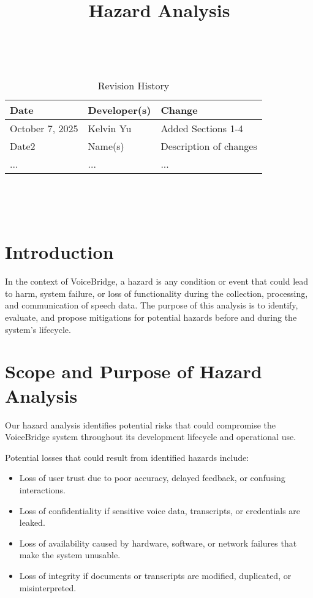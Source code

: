 \documentclass{article}
\title{Hazard Analysis\\\progname}
\author{\authname}
\date{}
\begin{document}
\maketitle
\thispagestyle{empty}

~\newpage


\begin{table}[hp]
\caption{Revision History} \label{TblRevisionHistory}
\begin{tabularx}{\textwidth}{llX}
\toprule
\textbf{Date} & \textbf{Developer(s)} & \textbf{Change}\\
\midrule
October 7, 2025 & Kelvin Yu & Added Sections 1-4\\
Date2 & Name(s) & Description of changes\\
... & ... & ...\\
\bottomrule
\end{tabularx}
\end{table}

~\newpage

\tableofcontents

~\newpage



\section{Introduction}

In the context of VoiceBridge, a hazard is any condition or event that could lead to harm, system failure, or loss of functionality during the collection, processing, and communication of speech data. 
The purpose of this analysis is to identify, evaluate, and propose mitigations for potential hazards before and during the system’s lifecycle.


\section{Scope and Purpose of Hazard Analysis}

Our hazard analysis identifies potential risks that could compromise the VoiceBridge system throughout its development lifecycle and operational use.

\vspace{3mm}
\noindent Potential losses that could result from identified hazards include:
\begin{itemize}
    \item Loss of user trust due to poor accuracy, delayed feedback, or confusing interactions. 
    \item Loss of confidentiality if sensitive voice data, transcripts, or credentials are leaked.
    \item Loss of availability caused by hardware, software, or network failures that make the system unusable.
    \item Loss of integrity if documents or transcripts are modified, duplicated, or misinterpreted.
\end{itemize}
\end{document}
